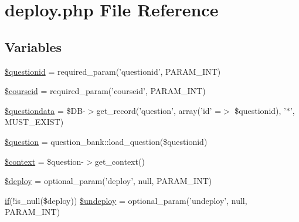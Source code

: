 \hypertarget{deploy_8php}{
\section{deploy.php File Reference}
\label{deploy_8php}
}
\subsection*{Variables}
\begin{DoxyCompactItemize}
\item 
\hyperlink{deploy_8php_a0b8a9e6194c5b1ca51e0f19a198c19d8}{\$questionid} = required\_\-param('questionid', PARAM\_\-INT)
\item 
\hyperlink{deploy_8php_a2a1b481ca3e5ae5c2d7a66d271302f23}{\$courseid} = required\_\-param('courseid', PARAM\_\-INT)
\item 
\hyperlink{deploy_8php_ab3dbd2b3f38fc871b3aba59ed0657c55}{\$questiondata} = \$DB-\/$>$get\_\-record('question', array('id' =$>$ \$questionid), '$\ast$', MUST\_\-EXIST)
\item 
\hyperlink{deploy_8php_acf0d1ba8b3999333306bf1a4fd363e93}{\$question} = question\_\-bank::load\_\-question(\$questionid)
\item 
\hyperlink{deploy_8php_ae05dedb802ada0155efdece2044fed64}{\$context} = \$question-\/$>$get\_\-context()
\item 
\hyperlink{deploy_8php_a779ebfa548d45444c88971ad5a5657e8}{\$deploy} = optional\_\-param('deploy', null, PARAM\_\-INT)
\item 
\hyperlink{caschat_8php_a2018ad56dfaea89ba7f32f4f912be98f}{if}(!is\_\-null(\$deploy)) \hyperlink{deploy_8php_aef06c52c3d0d3d9f585fcffd074b1d14}{\$undeploy} = optional\_\-param('undeploy', null, PARAM\_\-INT)
\end{DoxyCompactItemize}


